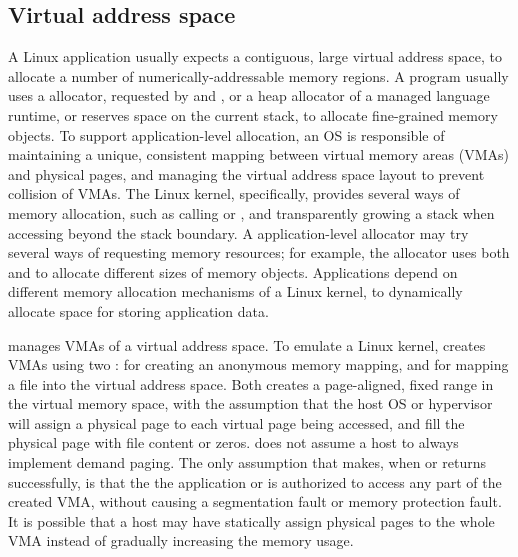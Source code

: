 \subsection{Virtual address space}
\label{sec:libos:vma}


A Linux application usually expects a contiguous, large virtual address space,
to allocate a number of numerically-addressable memory regions.
A program usually uses a \libc{} allocator, requested by  and ,
or a heap allocator of a managed language runtime,
or reserves space on the current stack,
to allocate fine-grained memory objects.
To support application-level allocation,
an OS is responsible of
maintaining a unique, consistent mapping between virtual memory areas (VMAs) and physical pages,
and managing the virtual address space layout
to prevent collision of VMAs.
The Linux kernel, specifically, provides several ways of memory allocation, such as calling  or ,
and transparently growing a stack when accessing beyond the stack boundary.
A application-level allocator may try several ways of requesting memory resources;
for example, the \glibc{} allocator
uses both  and  to allocate different sizes of memory objects.
Applications depend on different memory allocation mechanisms
of a Linux kernel,
to dynamically allocate space for storing application data.
 



\thelibos{} manages VMAs of a virtual address space.
To emulate a Linux kernel,
\thelibos{} creates VMAs using two \hostapis{}:
 for creating an anonymous memory mapping,
and  for mapping a file into the virtual address space.
Both \hostapis{} creates a page-aligned, fixed range in the
virtual memory space,
with the assumption that the host OS or hypervisor
will assign a physical page to each virtual page being accessed,
and fill the physical page with file content or zeros.
\thelibos{} does not assume
a host to always implement demand paging.
The only assumption that \thelibos{} makes, when  or  returns successfully,
is that 
the the application or 
\thelibos{} is authorized to access any part of the created VMA,
without causing a segmentation fault
or memory protection fault.
It is possible that a host may have statically assign
physical pages to the whole VMA instead of gradually increasing the memory usage.

